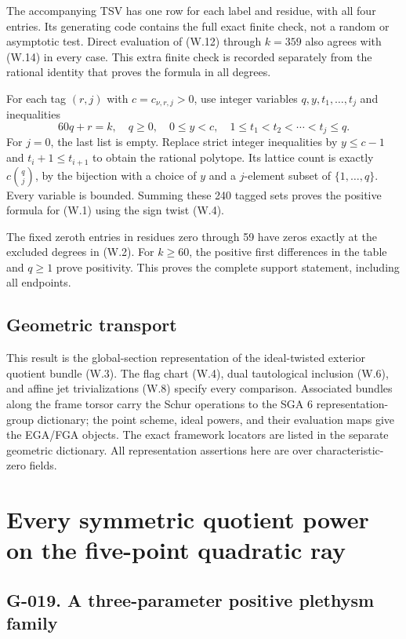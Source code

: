 \documentclass[
  10pt,
]{article}
\begin{document}
The accompanying TSV has one row for each label and residue, with all
four entries. Its generating code contains the full exact finite check,
not a random or asymptotic test. Direct evaluation of (W.12) through
\(k=359\) also agrees with (W.14) in every case. This extra finite check
is recorded separately from the rational identity that proves the
formula in all degrees.

For each tag \((r,j)\) with \(c=c_{\nu,r,j}>0\), use integer variables
\(q,y,t_1,\ldots,t_j\) and inequalities \[
60q+r=k,\quad q\ge0,\quad0\le y<c,\quad
1\le t_1<t_2<\cdots<t_j\le q.
\tag{W.15}
\] For \(j=0\), the last list is empty. Replace strict integer
inequalities by \(y\le c-1\) and \(t_i+1\le t_{i+1}\) to obtain the
rational polytope. Its lattice count is exactly \(c\binom qj\), by the
bijection with a choice of \(y\) and a \(j\)-element subset of
\(\{1,\ldots,q\}\). Every variable is bounded. Summing these 240 tagged
sets proves the positive formula for (W.1) using the sign twist (W.4).

The fixed zeroth entries in residues zero through 59 have zeros exactly
at the excluded degrees in (W.2). For \(k\ge60\), the positive first
differences in the table and \(q\ge1\) prove positivity. This proves the
complete support statement, including all endpoints.

\subsection{Geometric transport}\label{geometric-transport}

This result is the global-section representation of the ideal-twisted
exterior quotient bundle (W.3). The flag chart (W.4), dual tautological
inclusion (W.6), and affine jet trivializations (W.8) specify every
comparison. Associated bundles along the frame torsor carry the Schur
operations to the SGA 6 representation-group dictionary; the point
scheme, ideal powers, and their evaluation maps give the EGA/FGA
objects. The exact framework locators are listed in the separate
geometric dictionary. All representation assertions here are over
characteristic-zero fields.

\section{Every symmetric quotient power on the five-point quadratic
ray}\label{every-symmetric-quotient-power-on-the-five-point-quadratic-ray}

\subsection{G-019. A three-parameter positive plethysm
family}\label{g-019.-a-three-parameter-positive-plethysm-family}
\end{document}

